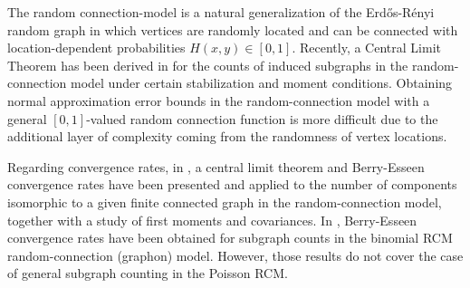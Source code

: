 \documentclass[bj,authoryear,noshowframe]{imsart}
\theoremstyle{plain}
\theoremstyle{remark}
\begin{document}
  
 The random connection-model is a natural generalization of the %
 Erd\H os-R\'enyi random graph in which vertices are randomly located
 and can be connected
 with location-dependent probabilities
 $H(x,y)\in [0,1]$.
 Recently, a Central Limit Theorem has been derived in \cite{can2022} for the counts of induced subgraphs in the random-connection model under certain stabilization and moment conditions. 
 Obtaining normal approximation error bounds 
 in the random-connection model
 with a general $[0,1]$-valued random connection function 
 is more difficult due to the additional layer of complexity coming from
 the randomness of vertex locations.
 
   
 Regarding convergence rates, in \cite{LNS21},
 a central limit theorem and Berry-Esseen convergence rates have
 been presented and applied to the number of components isomorphic
 to a given finite connected graph in the random-connection model,
 together with a study of ﬁrst moments and covariances.
 In \cite{zhangzs}, Berry-Esseen convergence rates have
 been obtained for subgraph counts
 in the binomial RCM random-connection (graphon) model. 
 However, those results do not cover the case of
 general subgraph counting in the Poisson RCM. 

 
\end{document}
